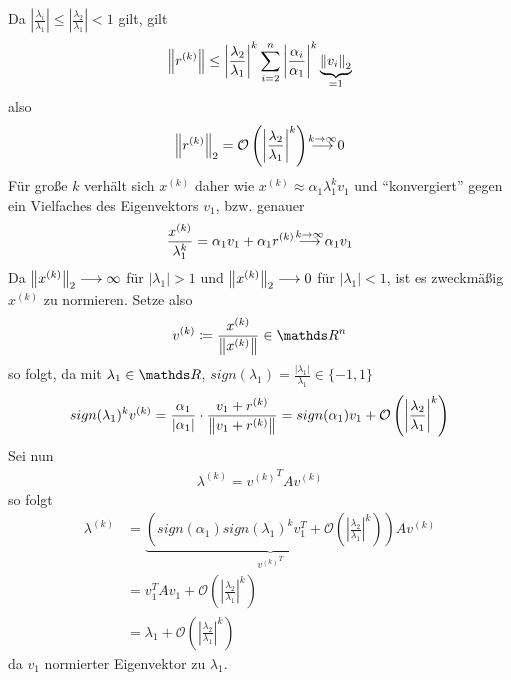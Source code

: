 Da $\left|\frac{\lambda_i}{\lambda_1}\right|
\leq \left|\frac{\lambda_2}{\lambda_1}\right|<1$
gilt, gilt
\begin{gather*}
  \nn[r^{(k)}] \leq \left|\frac{\lambda_2}{\lambda_1}\right|^k
  \sum_{i=2}^n \left|\frac{\alpha_i}{\alpha_1}\right|^k
    \underbrace{\nn[v_i]_2}_{=1}
\end{gather*}
also 
\begin{gather*}
  \nn[r^{(k)}]_2=\mathcal{O}\left(
    \left|\frac{\lambda_2}{\lambda_1}\right|^k 
  \right)
\overset{\mathclap{k\rightarrow \infty}}{\longrightarrow} 0
\end{gather*}
Für große $k$ verhält sich $x^{(k)}$ daher wie 
$ x^{(k)}\approx \alpha_1\lambda_1^kv_1$
und \enquote{konvergiert} gegen ein Vielfaches des Eigenvektors $v_1$,
bzw. genauer
\begin{gather*}
  \frac{x^{(k)}}{\lambda_1^k}= \alpha_1v_1+\alpha_1r^{(k)}
  \overset{\mathclap{k\rightarrow \infty}}{\longrightarrow}
  \alpha_1v_1
\end{gather*}
Da $\nn[x^{(k)}]_2\longrightarrow\infty$ für $|\lambda_1|>1$
und $\nn[x^{(k)}]_2\longrightarrow 0$ für $|\lambda_1|<1$,
ist es zweckmäßig $x^{(k)}$ zu normieren.
Setze also
\begin{gather}
  v^{(k)} \coloneqq \frac{x^{(k)}}{ \nn[x^{(k)}] } \in \R^n
\label{VIII.2.3}
\end{gather}
so folgt, da mit $\lambda_1\in \R$,
 $sign(\lambda_1)=\frac{|\lambda_1|}{\lambda_1}\in\{-1,1\}$
 \begin{gather}
   sign(\lambda_1)^k v^{(k)} = \frac{\alpha_1}{|\alpha_1|}
   \cdot \frac{v_1+r^{(k)}}{\nn[v_1+r^{(k)}]}
 = sign(\alpha_1)v_1 + \mathcal{O}\left(\left| 
     \frac{\lambda_2}{\lambda_1}
     \right|^k\right)
   \label{VIII.2.4}
 \end{gather}
Sei nun
\begin{gather}
  \lambda^{(k)} = {v^{(k)}}^TAv^{(k)}
  \label{VIII.2.5}
\end{gather}
so folgt 
\begin{align*}
  \lambda^{(k)} &= \underbrace{ \left(
                 sign(\alpha_1)sign(\lambda_1)^kv_1^T
                 +\mathcal{O}\left( \left| \frac{\lambda_2}{\lambda_1} 
                 \right|^k \right)\right)
                 }_{
                 {v^{(k)}}^T
                 } Av^{(k)} \\
               &=v_1^T A v_1 + \mathcal{O}\left( \left|
                 \frac{\lambda_2}{\lambda_1} 
                 \right|^k \right) \\
               &= \lambda_1 + \mathcal{O}\left( 
                 \left| \frac{\lambda_2}{\lambda_1} 
                 \right|^k \right)
\end{align*}
da $v_1$ normierter Eigenvektor zu $\lambda_1$.

